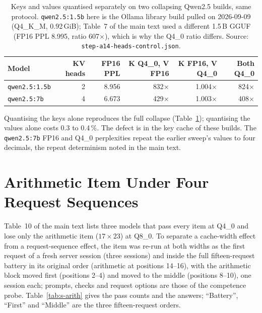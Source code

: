 \documentclass[11pt,a4paper]{article}
\begin{document}
\begin{table}[!ht]
\centering\small
\caption{Keys and values quantised separately on two collapsing Qwen2.5
builds, same protocol.  \texttt{qwen2.5:1.5b} here is the Ollama
library build pulled on 2026-09-09 (Q4\_K\_M, 0.92\,GiB); Table~7 of
the main text used a different 1.5\,B GGUF (FP16 PPL 8.995, ratio
607$\times$), which is why the Q4\_0 ratio differs.  Source:
\texttt{step-a14-heads-control.json}.}
\label{tab:s-kvsplit}
\begin{tabular}{@{}lrrrrr@{}}
\toprule
\textbf{Model} & \textbf{KV heads} & \textbf{FP16 PPL} & \textbf{K Q4\_0, V FP16} & \textbf{K FP16, V Q4\_0} & \textbf{Both Q4\_0} \\
\midrule
\texttt{qwen2.5:1.5b} & 2 & 8.956 & 832$\times$ & 1.004$\times$ & 824$\times$ \\
\texttt{qwen2.5:7b}   & 4 & 6.673 & 429$\times$ & 1.003$\times$ & 408$\times$ \\
\bottomrule
\end{tabular}
\end{table}

Quantising the keys alone reproduces the full collapse
(Table~\ref{tab:s-kvsplit}); quantising the values alone costs 0.3 to
0.4\,\%.  The defect is in the key cache of
these builds.  The \texttt{qwen2.5:7b} FP16 and Q4\_0 perplexities
repeat the earlier sweep's values to four decimals, the repeat
determinism noted in the main text.

\section{Arithmetic Item Under Four Request Sequences}

Table~10 of the main text lists three models that pass every item at
Q4\_0 and lose only the arithmetic item ($17\times23$) at Q8\_0.  To
separate a cache-width effect from a request-sequence effect, the item
was re-run at both widths as the first request of a fresh server
session (three sessions) and inside the full fifteen-request battery in
its original order (arithmetic at positions 14--16), with the
arithmetic block moved first (positions 2--4) and moved to the middle
(positions 8--10), one session each; prompts, checks and request
options are those of the competence probe.  Table~\ref{tab:s-arith}
gives the pass counts and the answers; ``Battery'', ``First'' and ``Middle'' are the three fifteen-request orders.
\end{document}
